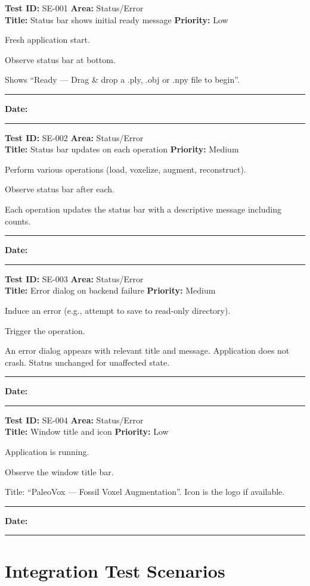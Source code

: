 \documentclass[12pt,a4paper]{article}
\newenvironment{testcase}[4]{%
  \smallskip
  \noindent\textbf{Test ID:} #1 \hfill \textbf{Area:} #2 \\
  \textbf{Title:} #3 \hfill \textbf{Priority:} #4
  \begin{description}[leftmargin=2em,style=nextline]
    \item[\textbf{Preconditions:}]
}{%
    \item[\textbf{Steps:}]
    \item[\textbf{Expected Result:}]
    \item[\textbf{Status:}] \rule{3cm}{0.4pt} \hspace{1em} \textbf{Date:} \rule{3cm}{0.4pt}
    \item[\textbf{Notes:}]
  \end{description}
  \smallskip
}
\begin{document}
\begin{testcase}{SE-001}{Status/Error}{Status bar shows initial ready message}{Low}
  \item Fresh application start.
  \item Observe status bar at bottom.
  \item Shows ``Ready --- Drag \& drop a .ply, .obj or .npy file to begin''.
\end{testcase}

\begin{testcase}{SE-002}{Status/Error}{Status bar updates on each operation}{Medium}
  \item Perform various operations (load, voxelize, augment, reconstruct).
  \item Observe status bar after each.
  \item Each operation updates the status bar with a descriptive message including counts.
\end{testcase}

\begin{testcase}{SE-003}{Status/Error}{Error dialog on backend failure}{Medium}
  \item Induce an error (e.g., attempt to save to read-only directory).
  \item Trigger the operation.
  \item An error dialog appears with relevant title and message. Application does not crash. Status unchanged for unaffected state.
\end{testcase}

\begin{testcase}{SE-004}{Status/Error}{Window title and icon}{Low}
  \item Application is running.
  \item Observe the window title bar.
  \item Title: ``PaleoVox --- Fossil Voxel Augmentation''. Icon is the logo if available.
\end{testcase}

\newpage
\section{Integration Test Scenarios}
\end{document}
